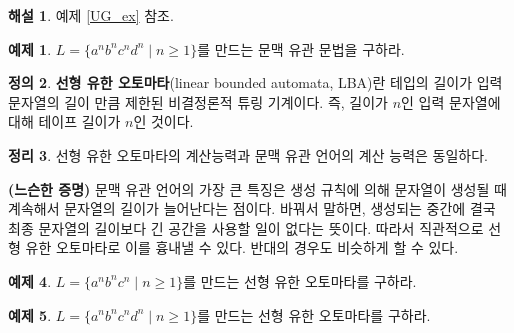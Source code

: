 \documentclass[b5paper, 11pt]{book}
\theoremstyle{definition}
\newtheorem{defn}{정의}[chapter]
\newtheorem{thm}[defn]{정리}
\newtheorem{ex}[defn]{예제}
\newtheorem*{ans*}{해설}
\newenvironment{pf*}{\pushQED{\qed}\pf}
{\popQED\endpf}
\begin{document}
\begin{ans*}
    예제 \ref{UG_ex} 참조.
\end{ans*}
\begin{ex}
    $L = \{a^n b^n c^n d^n \;\vert\; n \ge 1\}$를 만드는 문맥 유관 문법을 구하라.
\end{ex}
\begin{defn}
    \textbf{선형 유한 오토마타}(linear bounded automata, LBA)란 테입의 길이가 입력 문자열의 길이 만큼 제한된 비결정론적 튜링 기계이다. 즉, 길이가 $n$인 입력 문자열에 대해 테이프 길이가 $n$인 것이다.
\end{defn}
\begin{thm}
    선형 유한 오토마타의 계산능력과 문맥 유관 언어의 계산 능력은 동일하다.
\end{thm}
\begin{pf*}
    \textbf{(느슨한 증명)} 문맥 유관 언어의 가장 큰 특징은 생성 규칙에 의해 문자열이 생성될 때 계속해서 문자열의 길이가 늘어난다는 점이다. 바꿔서 말하면, 생성되는 중간에 결국 최종 문자열의 길이보다 긴 공간을 사용할 일이 없다는 뜻이다. 따라서 직관적으로 선형 유한 오토마타로 이를 흉내낼 수 있다. 반대의 경우도 비슷하게 할 수 있다.
\end{pf*}
\begin{ex}
    $L = \{a^n b^n c^n \;\vert\; n \ge 1\}$를 만드는 선형 유한 오토마타를 구하라.
\end{ex}
\begin{ex}
    $L = \{a^n b^n c^n d^n \;\vert\; n \ge 1\}$를 만드는 선형 유한 오토마타를 구하라.
\end{ex}
\end{document}
